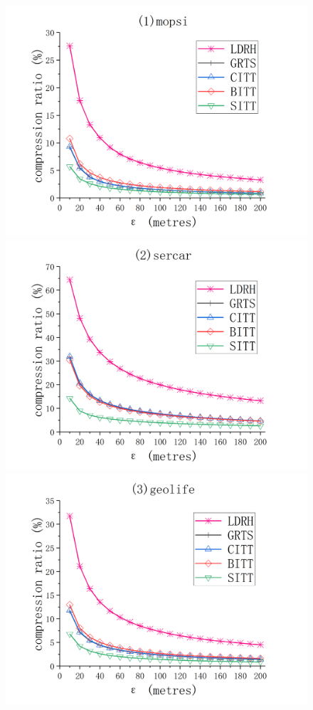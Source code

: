 {\begin{figure}[tb!]
	\centering
	\includegraphics[scale = 0.210]{figures/Fig-mopsi-compression-ratio.png}\hspace{1ex}
	\includegraphics[scale = 0.210]{figures/Fig-sercar-compression-ratio.png}\hspace{1ex}
	\includegraphics[scale = 0.210]{figures/Fig-geolife-compression-ratio.png}\hspace{1ex}

\end{figure}}
